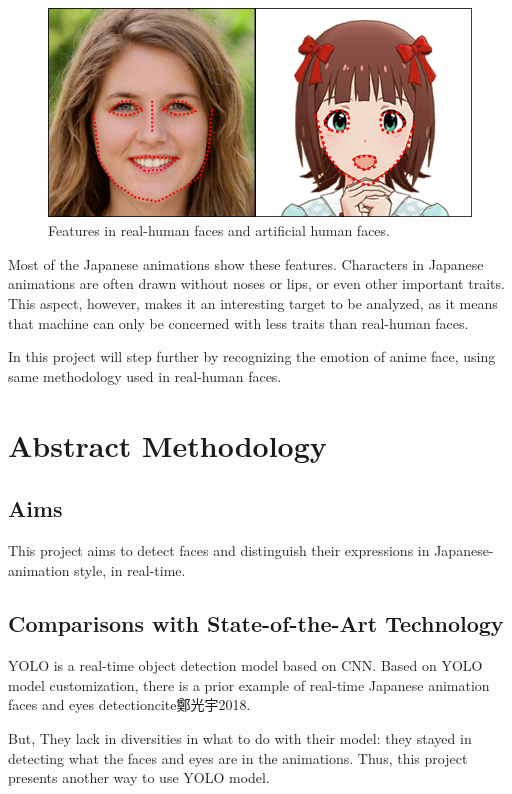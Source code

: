 \documentclass{article}
\begin{document}
\begin{figure}[ht]
\vskip 0.2in
\begin{center}
\centerline{\includegraphics[width=\columnwidth]{featured_compare.png}}
\caption{Features in real-human faces and artificial human faces.}
\label{icml-historical}
\end{center}
\vskip -0.2in
\end{figure}

Most of the Japanese animations show these features. Characters in Japanese animations are often drawn without noses or lips, or even other important traits. This aspect, however, makes it an interesting target to be analyzed, as it means that machine can only be concerned with less traits than real-human faces.

In this project will step further by recognizing the emotion of anime face, using same methodology used in real-human faces.

\section{Abstract Methodology}
\subsection{Aims}
This project aims to detect faces and distinguish their expressions in Japanese-animation style, in real-time.

\subsection{Comparisons with State-of-the-Art Technology}
YOLO is a real-time object detection model based on CNN.
Based on YOLO model customization, there is a prior example of real-time Japanese animation faces and eyes detectioncite{鄭光宇2018}.

But, They lack in diversities in what to do with their model: they stayed in detecting what the faces and eyes are in the animations.
Thus, this project presents another way to use YOLO model.
\end{document}
